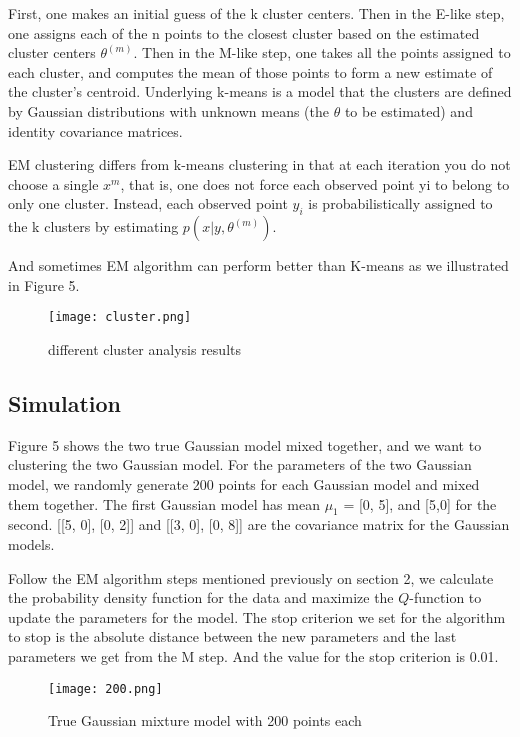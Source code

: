 \documentclass[onecolumn,12pt]{IEEEtran}
\begin{document}
First, one makes an initial guess of the k cluster centers. Then in the E-like step, one assigns each of the n points to the closest cluster based on the estimated cluster centers $\theta^{(m)}$. Then in the M-like step, one takes all the points assigned to each cluster, and computes the mean of those points to form a new estimate of the cluster’s centroid. Underlying k-means is a model that the clusters are defined by Gaussian distributions with unknown means (the $\theta$ to be estimated) and identity covariance matrices.

EM clustering differs from k-means clustering in that at each iteration you do not choose a single $x^m$, that is, one does not force each observed point yi to belong to only one cluster. Instead, each observed point $y_i$ is probabilistically assigned to the k clusters by estimating $p(x|y,\theta^{(m)})$. 

And sometimes EM algorithm can perform better than K-means as we illustrated in Figure 5.

\begin{figure}[!htb]
  \centering
  \texttt{[image: cluster.png]}
  \caption{different cluster analysis results}
\end{figure}

\subsection{Simulation}

Figure 5 shows the two true Gaussian model mixed together, and we want to clustering the two Gaussian model. For the parameters of the two Gaussian model, we randomly generate 200 points for each Gaussian model and mixed them together. The first Gaussian model has mean $\mu_1$ = [0, 5], and [5,0] for the second. [[5, 0], [0, 2]] and [[3, 0], [0, 8]] are the covariance matrix for the Gaussian models.

Follow the EM algorithm steps mentioned previously on section 2, we calculate the probability density function for the data and maximize the $Q$-function to update the parameters for the model. The stop criterion we set for the algorithm to stop is the absolute distance between the new parameters and the last parameters we get from the M step. And the value for the stop criterion is 0.01.

\begin{figure}[!htb]
  \centering
  \texttt{[image: 200.png]}
  \caption{True Gaussian mixture model with 200 points each}
\end{figure}
\end{document}
